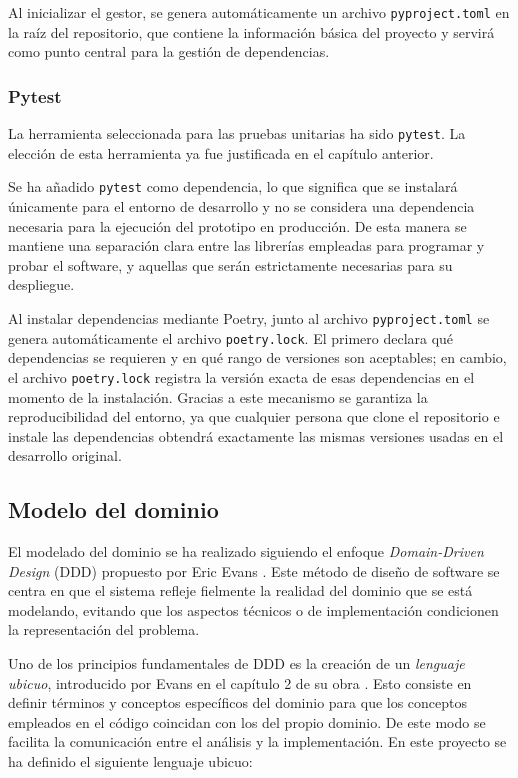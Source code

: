 Al inicializar el gestor, se genera automáticamente un archivo \texttt{pyproject.toml} en la raíz del
repositorio, que contiene la información básica del proyecto y servirá como punto central
para la gestión de dependencias.

\subsubsection{Pytest}
La herramienta seleccionada para las pruebas unitarias ha sido \texttt{pytest}.
La elección de esta herramienta ya fue justificada en el capítulo anterior.

Se ha añadido \texttt{pytest} como dependencia, lo que significa que se instalará únicamente
para el entorno de desarrollo y no se considera una dependencia necesaria para la ejecución del 
prototipo en producción. De esta manera se mantiene una separación clara entre las librerías 
empleadas para programar y probar el software, y aquellas que serán estrictamente necesarias para 
su despliegue.

Al instalar dependencias mediante Poetry, junto al archivo \texttt{pyproject.toml} se genera 
automáticamente el archivo \texttt{poetry.lock}. El primero declara qué dependencias se requieren y 
en qué rango de versiones son aceptables; en cambio, el archivo \texttt{poetry.lock} registra la 
versión exacta de esas dependencias en el momento de la instalación. Gracias a este mecanismo se 
garantiza la reproducibilidad del entorno, ya que cualquier persona que clone el repositorio e 
instale las dependencias obtendrá exactamente las mismas versiones usadas en el desarrollo 
original.

\subsection{Modelo del dominio}
El modelado del dominio se ha realizado siguiendo el enfoque \textit{Domain-Driven Design} (DDD)
propuesto por Eric Evans \cite{evansDDD}. Este método de diseño de software se centra en que
el sistema refleje fielmente la realidad del dominio que se está modelando, evitando que los 
aspectos técnicos o de implementación condicionen la representación del problema.

Uno de los principios fundamentales de DDD es la creación de un \textit{lenguaje ubicuo}, introducido
por Evans en el capítulo 2 de su obra \cite{evansDDD}. Esto consiste en definir términos y conceptos 
específicos del dominio para que los conceptos empleados en el código coincidan con los del propio 
dominio. De este modo se facilita la comunicación entre el análisis y la implementación. En este 
proyecto se ha definido el siguiente lenguaje ubicuo:

